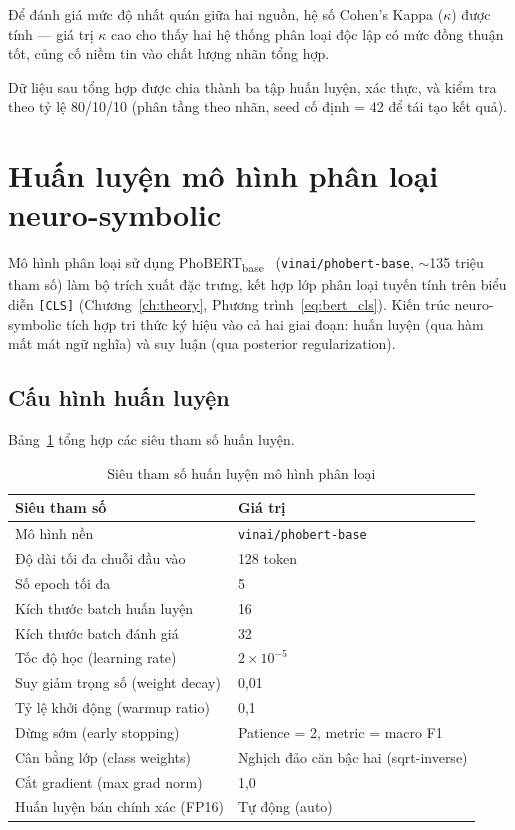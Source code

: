 Để đánh giá mức độ nhất quán giữa hai nguồn, hệ số Cohen's Kappa ($\kappa$) được tính --- giá trị $\kappa$ cao cho thấy hai hệ thống phân loại độc lập có mức đồng thuận tốt, củng cố niềm tin vào chất lượng nhãn tổng hợp.

Dữ liệu sau tổng hợp được chia thành ba tập huấn luyện, xác thực, và kiểm tra theo tỷ lệ 80/10/10 (phân tầng theo nhãn, seed cố định = 42 để tái tạo kết quả).


\section{Huấn luyện mô hình phân loại neuro-symbolic}
\label{sec:training}

Mô hình phân loại sử dụng PhoBERT\textsubscript{base}~\cite{nguyen2020phobert} (\texttt{vinai/phobert-base}, $\sim$135 triệu tham số) làm bộ trích xuất đặc trưng, kết hợp lớp phân loại tuyến tính trên biểu diễn \texttt{[CLS]} (Chương~\ref{ch:theory}, Phương trình~\ref{eq:bert_cls}). Kiến trúc neuro-symbolic tích hợp tri thức ký hiệu vào cả hai giai đoạn: huấn luyện (qua hàm mất mát ngữ nghĩa) và suy luận (qua posterior regularization).


\subsection{Cấu hình huấn luyện}
\label{subsec:training_config}

Bảng~\ref{tab:training_config} tổng hợp các siêu tham số huấn luyện.

\begin{table}[htbp]
\centering
\caption{Siêu tham số huấn luyện mô hình phân loại}
\label{tab:training_config}
\small
\renewcommand{\arraystretch}{1.2}
\begin{tabular}{|l|l|}
\hline
\textbf{Siêu tham số} & \textbf{Giá trị} \\
\hline
Mô hình nền & \texttt{vinai/phobert-base} \\
\hline
Độ dài tối đa chuỗi đầu vào & 128 token \\
\hline
Số epoch tối đa & 5 \\
\hline
Kích thước batch huấn luyện & 16 \\
\hline
Kích thước batch đánh giá & 32 \\
\hline
Tốc độ học (learning rate) & $2 \times 10^{-5}$ \\
\hline
Suy giảm trọng số (weight decay) & 0{,}01 \\
\hline
Tỷ lệ khởi động (warmup ratio) & 0{,}1 \\
\hline
Dừng sớm (early stopping) & Patience = 2, metric = macro F1 \\
\hline
Cân bằng lớp (class weights) & Nghịch đảo căn bậc hai (sqrt-inverse) \\
\hline
Cắt gradient (max grad norm) & 1{,}0 \\
\hline
Huấn luyện bán chính xác (FP16) & Tự động (auto) \\
\hline
\end{tabular}
\end{table}

